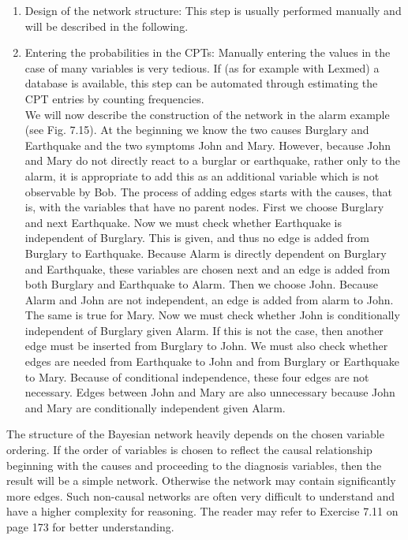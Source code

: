 \documentclass[10pt]{article}
\begin{document}
\begin{enumerate}
  \item Design of the network structure: This step is usually performed manually and will be described in the following.
  \item Entering the probabilities in the CPTs: Manually entering the values in the case of many variables is very tedious. If (as for example with Lexmed) a database is available, this step can be automated through estimating the CPT entries by counting frequencies.\\
We will now describe the construction of the network in the alarm example (see Fig. 7.15). At the beginning we know the two causes Burglary and Earthquake and the two symptoms John and Mary. However, because John and Mary do not directly react to a burglar or earthquake, rather only to the alarm, it is appropriate to add this as an additional variable which is not observable by Bob. The process of adding edges starts with the causes, that is, with the variables that have no parent nodes. First we choose Burglary and next Earthquake. Now we must check whether Earthquake is independent of Burglary. This is given, and thus no edge is added from Burglary to Earthquake. Because Alarm is directly dependent on Burglary and Earthquake, these variables are chosen next and an edge is added from both Burglary and Earthquake to Alarm. Then we choose John. Because Alarm and John are not independent, an edge is added from alarm to John. The same is true for Mary. Now we must check whether John is conditionally independent of Burglary given Alarm. If this is not the case, then another edge must be inserted from Burglary to John. We must also check whether edges are needed from Earthquake to John and from Burglary or Earthquake to Mary. Because of conditional independence, these four edges are not necessary. Edges between John and Mary are also unnecessary because John and Mary are conditionally independent given Alarm.
\end{enumerate}

The structure of the Bayesian network heavily depends on the chosen variable ordering. If the order of variables is chosen to reflect the causal relationship beginning with the causes and proceeding to the diagnosis variables, then the result will be a simple network. Otherwise the network may contain significantly more edges. Such non-causal networks are often very difficult to understand and have a higher complexity for reasoning. The reader may refer to Exercise 7.11 on page 173 for better understanding.
\end{document}
